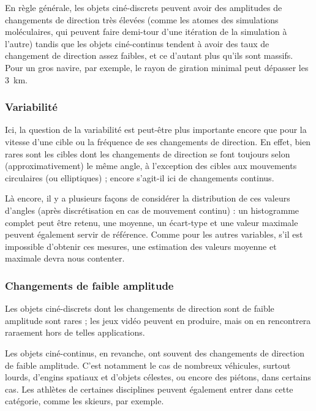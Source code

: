 	En règle générale, les objets ciné-discrets peuvent avoir des amplitudes de changements de direction très élevées (comme les atomes des simulations moléculaires, qui peuvent faire demi-tour d'une itération de la simulation à l'autre) tandis que les objets ciné-continus tendent à avoir des taux de changement de direction assez faibles, et ce d'autant plus qu'ils sont massifs. Pour un gros navire, par exemple, le rayon de giration minimal peut dépasser les 3~km\footnotemark{}.
	
	
	\subsubsection{Variabilité}
	Ici, la question de la variabilité est peut-être plus importante encore que pour la vitesse d'une cible ou la fréquence de ses changements de direction. En effet, bien rares sont les cibles dont les changements de direction se font toujours selon (approximativement) le même angle, à l'exception des cibles aux mouvements circulaires (ou elliptiques) ; encore s'agit-il ici de changements continus.
	
	Là encore, il y a plusieurs façons de considérer la distribution de ces valeurs d'angles (après discrétisation en cas de mouvement continu) : un histogramme complet peut être retenu, une moyenne, un écart-type et une valeur maximale peuvent également servir de référence. Comme pour les autres variables, s'il est impossible d'obtenir ces mesures, une estimation des valeurs moyenne et maximale devra nous contenter.
	
	\subsubsection{Changements de faible amplitude}
	Les objets ciné-discrets dont les changements de direction sont de faible amplitude sont rares ; les jeux vidéo peuvent en produire, mais on en rencontrera raraement hors de telles applications.
	
	Les objets ciné-continus, en revanche, ont souvent des changements de direction de faible amplitude. C'est notamment le cas de nombreux véhicules, surtout lourds, d'engins spatiaux et d'objets célestes, ou encore des piétons, dans certains cas. Les athlètes de certaines disciplines peuvent également entrer dans cette catégorie, comme les skieurs, par exemple.
	
